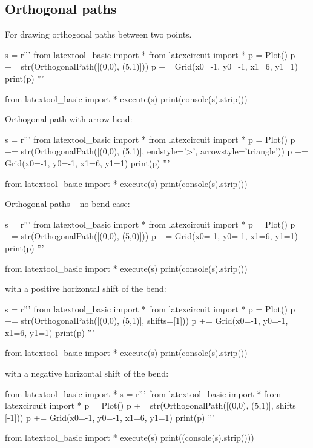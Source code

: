 \newpage
\subsection{Orthogonal paths}
For drawing orthogonal paths between two points.
\begin{python}
s = r'''
from latextool_basic import *
from latexcircuit import *
p = Plot()
p += str(OrthogonalPath([(0,0), (5,1)]))
p += Grid(x0=-1, y0=-1, x1=6, y1=1)
print(p)
'''

from latextool_basic import *
execute(s)
print(console(s).strip())
\end{python}


Orthogonal path with arrow head:
\begin{python}
s = r'''
from latextool_basic import *
from latexcircuit import *
p = Plot()
p += str(OrthogonalPath([(0,0), (5,1)], endstyle='>', arrowstyle='triangle'))
p += Grid(x0=-1, y0=-1, x1=6, y1=1)
print(p)
'''

from latextool_basic import *
execute(s)
print(console(s).strip())
\end{python}



\newpage
Orthogonal paths -- no bend case:
\begin{python}
s = r'''
from latextool_basic import *
from latexcircuit import *
p = Plot()
p += str(OrthogonalPath([(0,0), (5,0)]))
p += Grid(x0=-1, y0=-1, x1=6, y1=1)
print(p)
'''

from latextool_basic import *
execute(s)
print(console(s).strip())
\end{python}


\newpage
with a positive horizontal shift of the bend:
\begin{python}
s = r'''
from latextool_basic import *
from latexcircuit import *
p = Plot()
p += str(OrthogonalPath([(0,0), (5,1)], shifts=[1]))
p += Grid(x0=-1, y0=-1, x1=6, y1=1)
print(p)
'''

from latextool_basic import *
execute(s)
print(console(s).strip())
\end{python}


with a negative horizontal shift of the bend:
\begin{python}
from latextool_basic import *
s = r'''
from latextool_basic import *
from latexcircuit import *
p = Plot()
p += str(OrthogonalPath([(0,0), (5,1)], shifts=[-1]))
p += Grid(x0=-1, y0=-1, x1=6, y1=1)
print(p)
'''

from latextool_basic import *
execute(s)
print((console(s).strip()))
\end{python}

